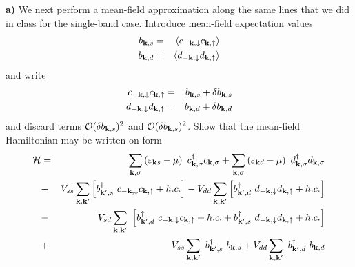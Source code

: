 \begin{problem}
\begin{center}
	\end{center}
	\ \\
	\ \\
	{\bf a)} We next perform a mean-field approximation along the same lines that we did in class for the single-band case. Introduce mean-field expectation values 
	\begin{eqnarray}
		b_{{\bf k},s} & = & \langle c_{-{\bf k},\downarrow}c_{{\bf k},\uparrow} \rangle \nonumber \\
		b_{{\bf k},d} & = & \langle d_{-{\bf k},\downarrow}d_{{\bf k},\uparrow} \rangle \nonumber 
	\end{eqnarray}
	and write 
	\begin{eqnarray}
		c_{-{\bf k},\downarrow}c_{{\bf k},\uparrow} & = & b_{{\bf k},s} + \delta b_{{\bf k},s}  \nonumber \\
		d_{-{\bf k},\downarrow}d_{{\bf k},\uparrow} & = & b_{{\bf k},d} + \delta b_{{\bf k},d}  \nonumber
	\end{eqnarray}
	and discard terms ${\cal O} (\delta b_{{\bf k},s})^2$ and ${\cal O} (\delta b_{{\bf k},s})^2$. Show that the mean-field Hamiltonian may be written on form
	\begin{eqnarray}
		\Ha&  = &  \sum_{{\bf k},\sigma} \left( \varepsilon_{{\bf k} s} - \mu \right) ~ c^{\dagger}_{{\bf k},\sigma} c_{{\bf k},\sigma}
		+  \sum_{{\bf k},\sigma} \left( \varepsilon_{{\bf k} d} - \mu \right)  ~ d^{\dagger}_{{\bf k},\sigma} d_{{\bf k},\sigma} \nonumber \\
		& - &  V_{ss} \sum_{{\bf k},{\bf k}^{\prime}} 
		\left[ b^{\dagger}_{{\bf k}^{\prime},s} ~ c_{-{\bf k},\downarrow}c_{{\bf k},\uparrow} + h.c. \right] 
		- V_{dd} \sum_{{\bf k},{\bf k}^{\prime}} 
		\left[ b^{\dagger}_{{\bf k}^{\prime},d} ~ d_{-{\bf k},\downarrow} d_{{\bf k},\uparrow} + h.c. \right] \nonumber \\
		& - & V_{sd} \sum_{{\bf k},{\bf k}^{\prime}} ~
		\left[ b^{\dagger}_{{\bf k}^{\prime},d} ~c_{-{\bf k},\downarrow} c_{{\bf k},\uparrow} + h.c. 
		+
		b^{\dagger}_{{\bf k}^{\prime},s} ~d_{-{\bf k},\downarrow} d_{{\bf k},\uparrow}  + h.c. \right] \nonumber \\
		& + &
		V_{ss}\sum_{{\bf k},{\bf k}^{\prime}} ~b^{\dagger}_{{\bf k}^{\prime},s}~b_{{\bf k},s}
		+
		V_{dd}\sum_{{\bf k},{\bf k}^{\prime}} ~b^{\dagger}_{{\bf k}^{\prime},d}~b_{{\bf k},d}

\end{eqnarray}
\end{problem}
